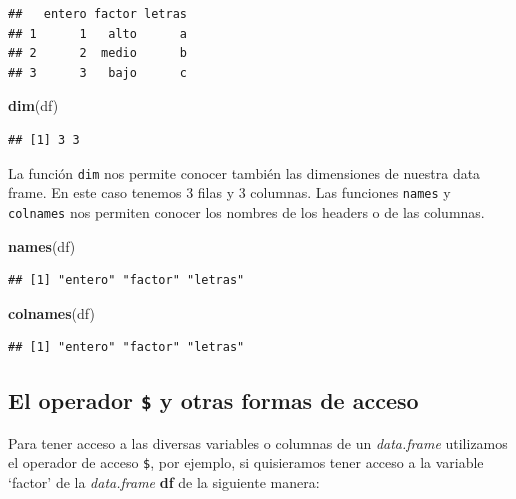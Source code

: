 \documentclass[
]{book}
\newenvironment{Shaded}{\begin{snugshade}}{\end{snugshade}}
\newcommand{\FunctionTok}[1]{\textcolor[rgb]{0.13,0.29,0.53}{\textbf{#1}}}
\newcommand{\NormalTok}[1]{#1}
\begin{document}
\begin{verbatim}
##   entero factor letras
## 1      1   alto      a
## 2      2  medio      b
## 3      3   bajo      c
\end{verbatim}

\begin{Shaded}
\begin{Highlighting}[]
\FunctionTok{dim}\NormalTok{(df)}
\end{Highlighting}
\end{Shaded}

\begin{verbatim}
## [1] 3 3
\end{verbatim}

La función \texttt{dim} nos permite conocer también las dimensiones de nuestra data frame.
En este caso tenemos 3 filas y 3 columnas.
Las funciones \texttt{names} y \texttt{colnames} nos permiten conocer los nombres de los headers o de las columnas.

\begin{Shaded}
\begin{Highlighting}[]
\FunctionTok{names}\NormalTok{(df)}
\end{Highlighting}
\end{Shaded}

\begin{verbatim}
## [1] "entero" "factor" "letras"
\end{verbatim}

\begin{Shaded}
\begin{Highlighting}[]
\FunctionTok{colnames}\NormalTok{(df)}
\end{Highlighting}
\end{Shaded}

\begin{verbatim}
## [1] "entero" "factor" "letras"
\end{verbatim}

\subsection{\texorpdfstring{El operador \texttt{\$} y otras formas de acceso}{El operador \$ y otras formas de acceso}}\label{el-operador-y-otras-formas-de-acceso}

Para tener acceso a las diversas variables o columnas de un \emph{data.frame} utilizamos el operador de acceso \texttt{\$}, por ejemplo, si quisieramos tener acceso a la variable `factor' de la \emph{data.frame} \textbf{df} de la siguiente manera:
\end{document}

